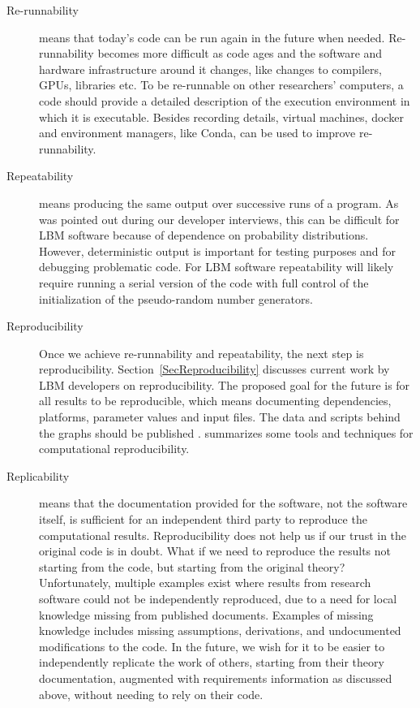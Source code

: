 \documentclass[final, 3p, times, authoryear]{elsarticle}
\begin{document}
\begin{description}

	\item[Re-runnability] means that today's code can be run again in the future
	when needed.  Re-runnability becomes more difficult as code ages and the
	software and hardware infrastructure around it changes, like changes to
	compilers, GPUs, libraries etc.  To be re-runnable on other researchers'
	computers, a code should provide a detailed description of the execution
	environment in which it is executable.  Besides recording details, virtual
	machines, docker and environment managers, like Conda, can be used to
	improve re-runnability.
	
	\item[Repeatability] means producing the same output over successive runs of
	a program.  As was pointed out during our developer interviews, this can be
	difficult for LBM software because of dependence on probability
	distributions.  However, deterministic output is important for testing
	purposes and for debugging problematic code.  For LBM software repeatability
	will likely require running a serial version of the code with full control
	of the initialization of the pseudo-random number generators.

	\item[Reproducibility] Once we achieve re-runnability and repeatability, the
	next step is reproducibility.  Section~\ref{SecReproducibility} discusses
	current work by LBM developers on reproducibility.  The proposed goal for
	the future is for all results to be reproducible, which means documenting
	dependencies, platforms, parameter values and input files. The data and
	scripts behind the graphs should be published
	\citep{BenureauAndRougier2017}.  \citet{PiccoloAndFrampton2016} summarizes
	some tools and techniques for computational reproducibility.

	\item[Replicability] means that the documentation provided for the software,
	not the software itself, is sufficient for an independent third party to
	reproduce the computational results.  Reproducibility does not help us if
	our trust in the original code is in doubt.  What if we need to reproduce
	the results not starting from the code, but starting from the original
	theory? Unfortunately, multiple examples exist \citep{CrickAndHall2014,
	IonescuAndJansson2013} where results from research software could not be
	independently reproduced, due to a need for local knowledge missing from
	published documents.  Examples of missing knowledge includes missing
	assumptions, derivations, and undocumented modifications to the code.  In
	the future, we wish for it to be easier to independently replicate the work
	of others, starting from their theory documentation, augmented with
	requirements information as discussed above, without needing to rely on
	their code.

\end{description}
\end{document}
